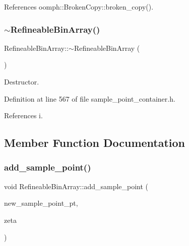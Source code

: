 References oomph\+::\+Broken\+Copy\+::broken\+\_\+copy().

\mbox{\label{classRefineableBinArray_a0ab4375c167506d001a9522307805ab4}} 
\subsubsection{\texorpdfstring{$\sim$\+Refineable\+Bin\+Array()}{~RefineableBinArray()}}
{\footnotesize\ttfamily Refineable\+Bin\+Array\+::$\sim$\+Refineable\+Bin\+Array (\begin{DoxyParamCaption}{ }\end{DoxyParamCaption})\hspace{0.3cm}{\ttfamily [inline]}}



Destructor. 



Definition at line 567 of file sample\+\_\+point\+\_\+container.\+h.



References i.



\subsection{Member Function Documentation}
\mbox{\label{classRefineableBinArray_a477a68e97b7cb297d38a0b2a844f53a5}} 
\subsubsection{\texorpdfstring{add\+\_\+sample\+\_\+point()}{add\_sample\_point()}}
{\footnotesize\ttfamily void Refineable\+Bin\+Array\+::add\+\_\+sample\+\_\+point (\begin{DoxyParamCaption}\item[{\hyperlink{classSamplePoint}{Sample\+Point} $\ast$}]{new\+\_\+sample\+\_\+point\+\_\+pt,  }\item[{const Vector$<$ double $>$ \&}]{zeta }\end{DoxyParamCaption})\hspace{0.3cm}{\ttfamily [inline]}}



